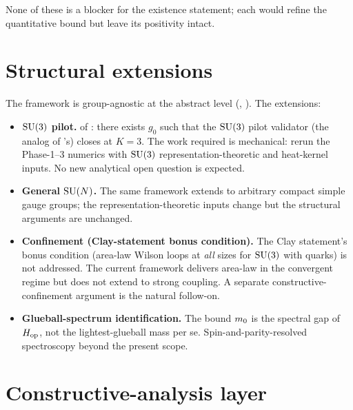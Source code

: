 None of these is a blocker for the existence statement; each
would refine the quantitative bound but leave its positivity
intact.

\section{Structural extensions}
\label{sec:roadmap-extensions}

%

The framework is group-agnostic at the abstract level
(, ).  The
extensions:

\begin{itemize}
  \item \textbf{$\mathrm{SU}(3)$ pilot.}
     of : there
    exists $g_0$ such that the $\mathrm{SU}(3)$ pilot validator
    (the analog of 's) closes at $K = 3$.  The
    work required is mechanical: rerun the Phase-1--3 numerics
    with $\mathrm{SU}(3)$ representation-theoretic and heat-kernel
    inputs.  No new analytical open question is expected.

  \item \textbf{General $\mathrm{SU}(N)$.}  The same framework extends to
    arbitrary compact simple gauge groups; the
    representation-theoretic inputs change but the structural
    arguments are unchanged.

  \item \textbf{Confinement (Clay-statement bonus condition).}
    The Clay statement's bonus condition (area-law Wilson loops
    at \emph{all} sizes for $\mathrm{SU}(3)$ with quarks) is not
    addressed.  The current framework delivers area-law in the
    convergent regime but does not extend to strong coupling.
    A separate constructive-confinement argument is the natural
    follow-on.

  \item \textbf{Glueball-spectrum identification.}  The bound
    $m_0$ is the spectral gap of $H_{\mathrm{op}}$, not the
    lightest-glueball mass per se.  Spin-and-parity-resolved
    spectroscopy beyond the present scope.
\end{itemize}

\section{Constructive-analysis layer}
\label{sec:roadmap-creal}

